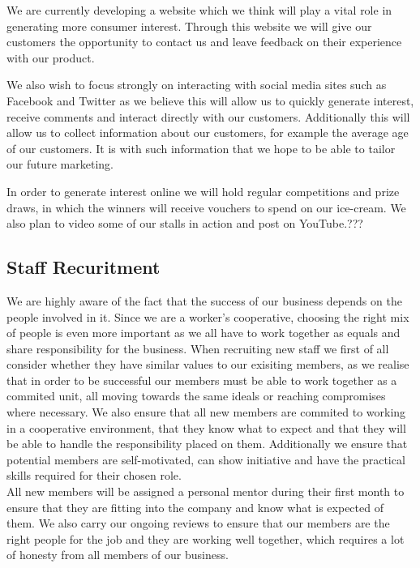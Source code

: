 \documentclass{article}
\begin{document}
  We are currently developing a website which we think will play a vital role in generating more consumer interest. Through this website we will give our customers the opportunity to contact us and leave feedback on their experience with our product.

  We also wish to focus strongly on interacting with social media sites such as Facebook and Twitter as we believe this will allow us to quickly generate interest, receive comments and interact directly with our customers. Additionally this will allow us to collect information about our customers, for example the average age of our customers. It is with such information that we hope to be able to tailor our future marketing.

  In order to generate interest online we will hold regular competitions and prize draws, in which the winners will receive vouchers to spend on our ice-cream. We also plan to video some of our stalls in action and post on YouTube.???

  \subsection{Staff Recuritment}

  We are highly aware of the fact that the success of our business depends on the people involved in it. Since we are a worker's cooperative, choosing the right mix of people is even more important as we all have to work together as equals and share responsibility for the business. When recruiting new staff we first of all consider whether they have similar values to our exisiting members, as we realise that in order to be successful our members must be able to work together as a commited unit, all moving towards the same ideals or reaching compromises where necessary. We also ensure that all new members are commited to working in a cooperative environment, that they know what to expect and that they will be able to handle the responsibility placed on them. Additionally we ensure that potential members are self-motivated, can show initiative and have the practical skills required for their chosen role. \\

  All new members will be assigned a personal mentor during their first month to ensure that they are fitting into the company and know what is expected of them. We also carry our ongoing reviews to ensure that our members are the right people for the job and they are working well together, which requires a lot of honesty from all members of our business. \\
\end{document}
